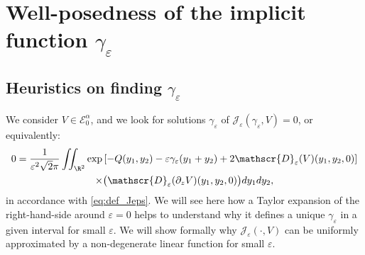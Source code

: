 \documentclass[JEP,XML,SOM,Unicode]{cedram}
\let\mathcal\mathscr
\theoremstyle{plain}
\theoremstyle{definition}
\newcommand{\D}{\mathcal{D}_\eps}
\newcommand{\Je}{\mathcal{J}_\eps}
\let\eps\varepsilon
\let\ds\displaystyle
\newcommand{\Eaz}{\mathcal{E}^\alpha_0}
\begin{document}
\section{Well-posedness of the implicit function \texorpdfstring{$\gamma_\eps$}{ge}}\label{sec existunique gammaeps}
\subsection{Heuristics on finding \texorpdfstring{$\gamma_\eps$}{ge}}\label{sec heuristicsgammaeps}
We consider $V \in \Eaz$, and we look for solutions $\gamma_\eps$ of $\Je(\gamma_\eps,V) = 0$, or equivalently:
\begin{multline}\label{eq:heurgam_equ}
0 = \dfrac{1}{\eps^2\sqrt{2}\pi} \ds \iint_{\R^2} \exp \left[-Q(y_1,y_2) - \eps \gamma_\eps (y_1+y_2) +2 \D(V)(y_1,y_2,0) \right]\\
\times \bigl(\D(\partial_z V)(y_1,y_2,0)\bigr) d y_1 d y_2,
\end{multline}
in accordance with \eqref{eq:def_Jeps}. We will see here how a Taylor expansion of the right-hand-side around $\eps = 0$ helps to understand why it defines a unique $\gamma_\eps$ in a given interval for small $\eps$. We will show formally why $\Je(\cdot,V)$ can be uniformly approximated by a non-degenerate linear function for small $\eps$.
\end{document}
